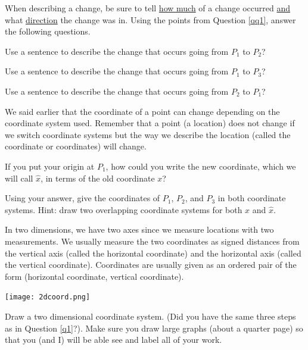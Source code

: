 \bq When describing a change, be sure to tell \underline{how much} of a change occurred \underline{and} what \underline{direction} the change was in. Using the points from Question \ref{qq1}, answer the following questions.
\be
\item Use a sentence to describe the change that occurs going from $P_1$ to $P_2$?
\item Use a sentence to describe the change that occurs going from $P_1$ to $P_3$?
\item Use a sentence to describe the change that occurs going from $P_2$ to $P_1$?
\ee\eq

\bq\label{qpoints} We said earlier that the coordinate of a point can change depending on the coordinate system used. Remember that a point (a location) does not change if we switch coordinate systems but the way we describe the location (called the coordinate or coordinates) will change.\be
\item If you put your origin at $P_1$, how could you write the new coordinate, which we will call $\hat{x}$, in terms of the old coordinate $x$?
\item Using your answer, give the coordinates of $P_1$, $P_2$, and $P_3$ in both coordinate systems. Hint: draw two overlapping coordinate systems for both $x$ and $\hat{x}$.
\ee
\eq


\begin{info}In two dimensions, we have two axes since we measure locations with two measurements. We usually measure the two coordinates as signed distances from the vertical axis (called the horizontal coordinate) and the horizontal axis (called the vertical coordinate). Coordinates are usually given as an ordered pair of the form (horizontal coordinate, vertical coordinate).

\begin{center} \texttt{[image: 2dcoord.png]} \end{center}

\end{info}

\bq Draw a two dimensional coordinate system. (Did you have the same three steps as in Question \ref{q1}?). Make sure you draw large graphs (about a quarter page) so that you (and I) will be able see and label all of your work.

